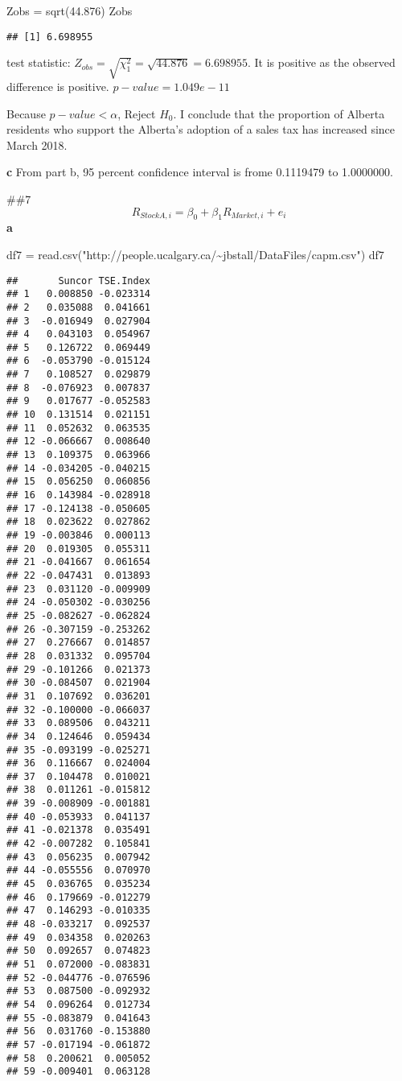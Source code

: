 \documentclass[
]{article}
\newenvironment{Shaded}{\begin{snugshade}}{\end{snugshade}}
\newcommand{\FloatTok}[1]{\textcolor[rgb]{0.00,0.00,0.81}{#1}}
\newcommand{\FunctionTok}[1]{\textcolor[rgb]{0.00,0.00,0.00}{#1}}
\newcommand{\NormalTok}[1]{#1}
\newcommand{\OtherTok}[1]{\textcolor[rgb]{0.56,0.35,0.01}{#1}}
\newcommand{\StringTok}[1]{\textcolor[rgb]{0.31,0.60,0.02}{#1}}
\begin{document}
\begin{Shaded}
\begin{Highlighting}[]
\NormalTok{Zobs }\OtherTok{=} \FunctionTok{sqrt}\NormalTok{(}\FloatTok{44.876}\NormalTok{)}
\NormalTok{Zobs}
\end{Highlighting}
\end{Shaded}

\begin{verbatim}
## [1] 6.698955
\end{verbatim}

test statistic:
\(Z_{obs} = \sqrt{\chi^{2}_{1}} = \sqrt{44.876} = 6.698955\). It is
positive as the observed difference is positive. \(p-value = 1.049e-11\)

Because \(p-value < \alpha\), Reject \(H_{0}\). I conclude that the
proportion of Alberta residents who support the Alberta's adoption of a
sales tax has increased since March 2018.

\textbf{c} From part b, 95 percent confidence interval is frome
0.1119479 to 1.0000000.

\#\#7 \[
R_{StockA,i} = \beta_{0} + \beta_{1}R_{Market, i} + e_{i}   
\] \textbf{a}

\begin{Shaded}
\begin{Highlighting}[]
\NormalTok{df7 }\OtherTok{=} \FunctionTok{read.csv}\NormalTok{(}\StringTok{"http://people.ucalgary.ca/\textasciitilde{}jbstall/DataFiles/capm.csv"}\NormalTok{)}
\NormalTok{df7}
\end{Highlighting}
\end{Shaded}

\begin{verbatim}
##       Suncor TSE.Index
## 1   0.008850 -0.023314
## 2   0.035088  0.041661
## 3  -0.016949  0.027904
## 4   0.043103  0.054967
## 5   0.126722  0.069449
## 6  -0.053790 -0.015124
## 7   0.108527  0.029879
## 8  -0.076923  0.007837
## 9   0.017677 -0.052583
## 10  0.131514  0.021151
## 11  0.052632  0.063535
## 12 -0.066667  0.008640
## 13  0.109375  0.063966
## 14 -0.034205 -0.040215
## 15  0.056250  0.060856
## 16  0.143984 -0.028918
## 17 -0.124138 -0.050605
## 18  0.023622  0.027862
## 19 -0.003846  0.000113
## 20  0.019305  0.055311
## 21 -0.041667  0.061654
## 22 -0.047431  0.013893
## 23  0.031120 -0.009909
## 24 -0.050302 -0.030256
## 25 -0.082627 -0.062824
## 26 -0.307159 -0.253262
## 27  0.276667  0.014857
## 28  0.031332  0.095704
## 29 -0.101266  0.021373
## 30 -0.084507  0.021904
## 31  0.107692  0.036201
## 32 -0.100000 -0.066037
## 33  0.089506  0.043211
## 34  0.124646  0.059434
## 35 -0.093199 -0.025271
## 36  0.116667  0.024004
## 37  0.104478  0.010021
## 38  0.011261 -0.015812
## 39 -0.008909 -0.001881
## 40 -0.053933  0.041137
## 41 -0.021378  0.035491
## 42 -0.007282  0.105841
## 43  0.056235  0.007942
## 44 -0.055556  0.070970
## 45  0.036765  0.035234
## 46  0.179669 -0.012279
## 47  0.146293 -0.010335
## 48 -0.033217  0.092537
## 49  0.034358  0.020263
## 50  0.092657  0.074823
## 51  0.072000 -0.083831
## 52 -0.044776 -0.076596
## 53  0.087500 -0.092932
## 54  0.096264  0.012734
## 55 -0.083879  0.041643
## 56  0.031760 -0.153880
## 57 -0.017194 -0.061872
## 58  0.200621  0.005052
## 59 -0.009401  0.063128
\end{verbatim}
\end{document}
